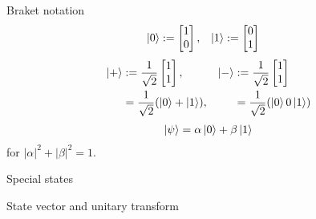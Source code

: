 \documentclass{beamer}
\begin{document}
\begin{frame}{Braket notation}
\begin{align*}
\ket{0} &:= \begin{bmatrix}1\\0\end{bmatrix},&
\ket{1} &:= \begin{bmatrix}0\\1\end{bmatrix}
\end{align*}
\begin{align*}
\ket{+} &:= \frac1{\sqrt{2}}\begin{bmatrix}1\\1\end{bmatrix},&
\ket{-} &:= \frac1{\sqrt{2}}\begin{bmatrix}1\\1\end{bmatrix}\\
&=\frac1{\sqrt{2}}(\ket{0}+\ket{1}),&
&=\frac1{\sqrt{2}}(\ket{0}0\ket{1})
\end{align*}
\begin{align*}
\ket{\psi} = \alpha\ket{0}+\beta\ket{1}
\end{align*}
for $|\alpha|^2+|\beta|^2=1$.
\end{frame}

\begin{frame}{Special states}
\end{frame}

\begin{frame}{State vector and unitary transform}
\end{frame}
\end{document}
